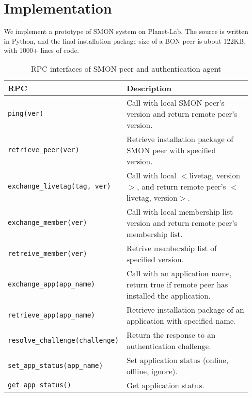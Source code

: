 \section{Implementation}
\label{sec:impl}

We implement a prototype of SMON system on Planet-Lab.  The
source is written in Python, and the final installation
package size of a BON peer is about 122KB, with 1000+ lines
of code.

\begin{table*}
\small
\centering
\begin{tabular}{|l|l|}

\hline
\textbf{RPC} & \textbf{Description} \\

\hline
\texttt{ping(ver)} & Call with local SMON peer's version and
return remote peer's version.\\

\hline
\texttt{retrieve\_peer(ver)} & Retrieve installation package
of SMON peer with specified version.\\

\hline
\texttt{exchange\_livetag(tag, ver)} & Call with local
$<$livetag, version$>$, and return remote peer's $<$livetag,
version$>$.\\

\hline
\texttt{exchange\_member(ver)} & Call with local membership
list version and return remote peer's membership list.\\

\hline
\texttt{retreive\_member(ver)} & Retrive membership list of
specified version.\\

\hline
\texttt{exchange\_app(app\_name)} & Call with an application
name, return true if remote peer has installed the
application.\\

\hline
\texttt{retrieve\_app(app\_name)} & Retrieve installation package
of an application with specified name.\\

\hline
\texttt{resolve\_challenge(challenge)} & Return the response
to an authentication challenge.\\

\hline
\texttt{set\_app\_status(app\_name)} & Set application status (online,
offline, ignore).\\

\hline
\texttt{get\_app\_status()} & Get application status. \\

\hline

\end{tabular}
\caption{RPC interfaces of SMON peer and authentication
agent}
\label{fig:rpc}
\end{table*}

